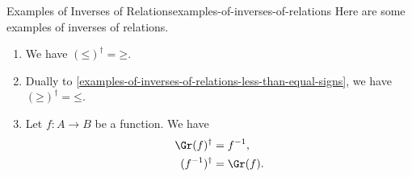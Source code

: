 \begin{example}{Examples of Inverses of Relations}{examples-of-inverses-of-relations}%
    Here are some examples of inverses of relations.
    \begin{enumerate}
        \item\label{examples-of-inverses-of-relations-less-than-equal-signs}We have $(\mathord{\leq})^{\dagger}=\mathord{\geq}$.
        \item\label{examples-of-inverses-of-relations-greater-than-equal-signs}Dually to \cref{examples-of-inverses-of-relations-less-than-equal-signs}, we have $(\mathord{\geq})^{\dagger}=\mathord{\leq}$.
        \item\label{examples-of-inverses-of-relations-functions}Let $f\colon A\to B$ be a function. We have
            \begin{align*}
                \Gr(f)^{\dagger}   &= f^{-1},\\
                (f^{-1})^{\dagger} &= \Gr(f).
            \end{align*}
    \end{enumerate}
\end{example}
